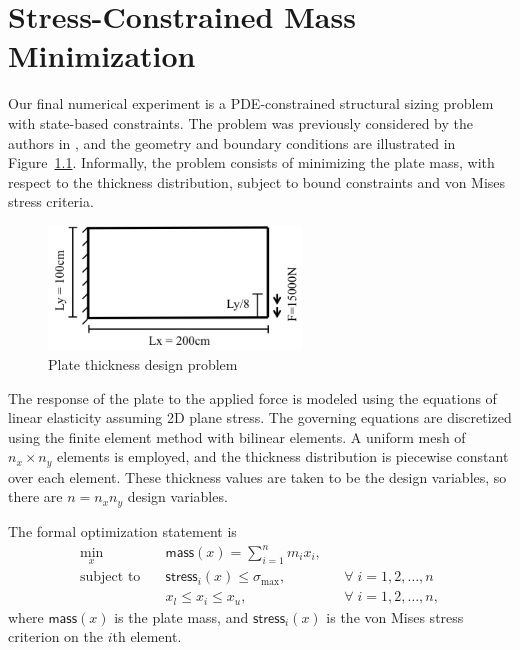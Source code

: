  
\chapter{Stress-Constrained Mass Minimization}
Our final numerical experiment is a PDE-constrained structural sizing problem
with state-based constraints.  The problem was previously considered by the
authors in \cite{dener:scitech2016}, and the geometry and boundary conditions
are illustrated in Figure~\ref{fig:struct}.  Informally, the problem consists of
minimizing the plate mass, with respect to the thickness distribution, subject
to bound constraints and von Mises stress criteria. 
\begin{figure}[tbp]
  \centering
  \includegraphics[width=0.6\textwidth]{./figs/newres2/struct.png}
  \caption{Plate thickness design problem}
  \label{fig:struct}
\end{figure}

The response of the plate to the applied force is modeled using the equations of
linear elasticity assuming 2D plane stress.  The governing equations are
discretized using the finite element method with bilinear elements.
A uniform mesh of $n_x \times n_y$ elements is employed, and the thickness
distribution is piecewise constant over each element.  These thickness values
are taken to be the design variables, so there are $n = n_x n_y$ design
variables.

The formal optimization statement is
\begin{equation*}
  \begin{alignedat}{2}
    \underset{x}{\text{min}} \quad &\textsf{mass}(x) = \sum_{i=1}^{n} m_i x_i, & &\\
    \text{subject to} \quad &\textsf{stress}_i(x) \leq \sigma_{\max}, &
    &\forall\; i = 1,2,\ldots,n \\
      & x_l \leq x_i \leq  x_u, \qquad & &\forall\; i = 1,2,\ldots,n,
  \end{alignedat}
\end{equation*}
where $\textsf{mass}(x)$ is the plate mass, and $\textsf{stress}_{i}(x)$ is the
von Mises stress criterion on the $i$th element.   

